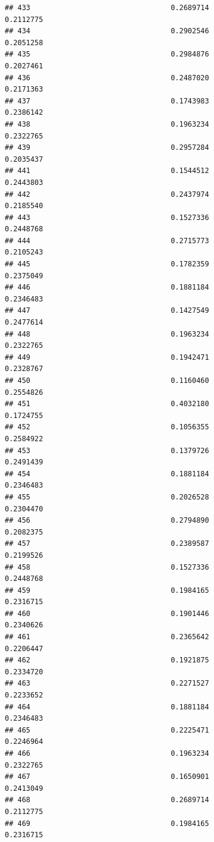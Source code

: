 \documentclass[
  american,
  man,floatsintext]{apa7}
\begin{document}
\begin{verbatim}
## 433                                 0.2689714               0.2112775
## 434                                 0.2902546               0.2051258
## 435                                 0.2984876               0.2027461
## 436                                 0.2487020               0.2171363
## 437                                 0.1743983               0.2386142
## 438                                 0.1963234               0.2322765
## 439                                 0.2957284               0.2035437
## 441                                 0.1544512               0.2443803
## 442                                 0.2437974               0.2185540
## 443                                 0.1527336               0.2448768
## 444                                 0.2715773               0.2105243
## 445                                 0.1782359               0.2375049
## 446                                 0.1881184               0.2346483
## 447                                 0.1427549               0.2477614
## 448                                 0.1963234               0.2322765
## 449                                 0.1942471               0.2328767
## 450                                 0.1160460               0.2554826
## 451                                 0.4032180               0.1724755
## 452                                 0.1056355               0.2584922
## 453                                 0.1379726               0.2491439
## 454                                 0.1881184               0.2346483
## 455                                 0.2026528               0.2304470
## 456                                 0.2794890               0.2082375
## 457                                 0.2389587               0.2199526
## 458                                 0.1527336               0.2448768
## 459                                 0.1984165               0.2316715
## 460                                 0.1901446               0.2340626
## 461                                 0.2365642               0.2206447
## 462                                 0.1921875               0.2334720
## 463                                 0.2271527               0.2233652
## 464                                 0.1881184               0.2346483
## 465                                 0.2225471               0.2246964
## 466                                 0.1963234               0.2322765
## 467                                 0.1650901               0.2413049
## 468                                 0.2689714               0.2112775
## 469                                 0.1984165               0.2316715

\end{verbatim}
\end{document}
